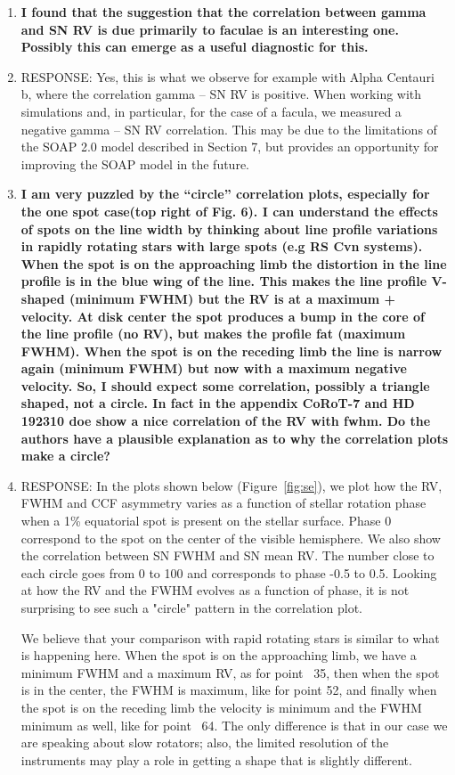 \documentclass[11pt]{article}   	%
\begin{document}
\begin{enumerate}
\bigskip
%
%
\item {\bf I found that the suggestion that the correlation between gamma and SN RV is due primarily to faculae is an interesting one. Possibly this can emerge as a useful diagnostic for this.}
%
\item[]  RESPONSE:  Yes, this is what we observe for example with Alpha Centauri b, where the correlation gamma -- SN RV is positive. 
When working with simulations and, in particular, for the case of a facula, we measured a negative gamma -- SN RV correlation. 
This may be due to the limitations of the SOAP 2.0 model described in Section 7, but provides an opportunity for improving the SOAP model in the future.
\bigskip
%
%
\item {\bf I am very puzzled by the ``circle'' correlation plots, especially for the one spot case(top right of Fig. 6). I can understand the effects of spots on the line width by thinking about line profile variations in rapidly rotating stars with large spots (e.g RS Cvn systems). When the spot is on the approaching limb the distortion in the line profile is in the blue wing of the line. This makes the line profile V-shaped (minimum FWHM) but the RV is at a maximum + velocity. At disk center the spot produces a bump in the core of the line profile (no RV), but makes the profile fat (maximum FWHM). When the spot is on the receding limb the line is narrow again (minimum FWHM) but now with a maximum negative velocity. So, I should expect some correlation, possibly a triangle shaped, not a circle. In fact in the appendix CoRoT-7 and HD 192310 doe show a nice correlation of the RV with fwhm. Do the authors have a plausible explanation as to why the correlation plots make a circle?}
%
\item[]  RESPONSE:  In the plots shown below (Figure~\ref{fig:se}), we plot how the RV, FWHM and CCF asymmetry varies as a function of stellar rotation phase when a 1\% equatorial spot is present on the stellar surface. Phase 0 correspond to the spot on the center of the visible hemisphere. We also show the correlation between SN FWHM and SN mean RV. The number close to each circle goes from 0 to 100 and corresponds to phase -0.5 to 0.5. Looking at how the RV and the FWHM evolves as a function of phase, it is not surprising to see such a "circle" pattern in the correlation plot.

We believe that your comparison with rapid rotating stars is similar to what is happening here. 
When the spot is on the approaching limb, we have a minimum FWHM and a maximum RV, as for point ~35, then when the spot is in the center, the FWHM is maximum, like for point 52, and finally when the spot is on the receding limb the velocity is minimum and the FWHM minimum as well, like for point ~64. 
The only difference is that in our case we are speaking about slow rotators; also, the limited resolution of the instruments may play a role in getting a shape that is slightly different.


\end{enumerate}
\end{document}

